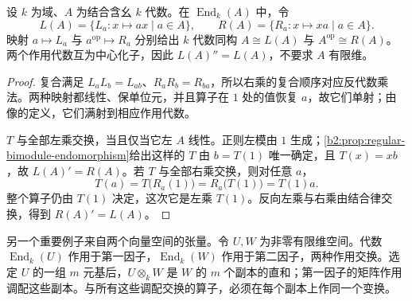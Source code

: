 \begin{theorem}[正则作用的双中心化子]\label{b2:thm:regular-double-centralizer}
	设 \(k\) 为域、\(A\) 为结合含幺 \(k\) 代数。在 \(\operatorname{End}_k(A)\) 中，令
	\[
		L(A)=\{L_a:x\mapsto ax\mid a\in A\},\qquad R(A)=\{R_a:x\mapsto xa\mid a\in A\}.
	\]
	映射 \(a\mapsto L_a\) 与 \(a^{\mathrm{op}}\mapsto R_a\) 分别给出 \(k\) 代数同构 \(A\cong L(A)\) 与 \(A^{\mathrm{op}}\cong R(A)\)。两个作用代数互为中心化子，因此 \(L(A)''=L(A)\)，不要求 \(A\) 有限维。
\end{theorem}
\begin{proof}
	复合满足 \(L_aL_b=L_{ab}\)、\(R_aR_b=R_{ba}\)，所以右乘的复合顺序对应反代数乘法。两种映射都线性、保单位元，并且算子在 \(1\) 处的值恢复 \(a\)，故它们单射；由像的定义，它们满射到相应作用代数。

	\(T\) 与全部左乘交换，当且仅当它左 \(A\) 线性。正则左模由 \(1\) 生成；\cref{b2:prop:regular-bimodule-endomorphism}给出这样的 \(T\) 由 \(b=T(1)\) 唯一确定，且 \(T(x)=xb\)，故 \(L(A)'=R(A)\)。若 \(T\) 与全部右乘交换，则对任意 \(a\)，
	\[
		T(a)=T\bigl(R_a(1)\bigr)=R_a\bigl(T(1)\bigr)=T(1)a.
	\]
	整个算子仍由 \(T(1)\) 决定，这次它是左乘 \(T(1)\)。反向左乘与右乘由结合律交换，得到 \(R(A)'=L(A)\)。
\end{proof}

另一个重要例子来自两个向量空间的张量。令 \(U,W\) 为非零有限维空间。代数 \(\operatorname{End}_k(U)\) 作用于第一因子，\(\operatorname{End}_k(W)\) 作用于第二因子，两种作用交换。选定 \(U\) 的一组 \(m\) 元基后，\(U\otimes_kW\) 是 \(W\) 的 \(m\) 个副本的直和；第一因子的矩阵作用调配这些副本。与所有这些调配交换的算子，必须在每个副本上作同一个变换。

